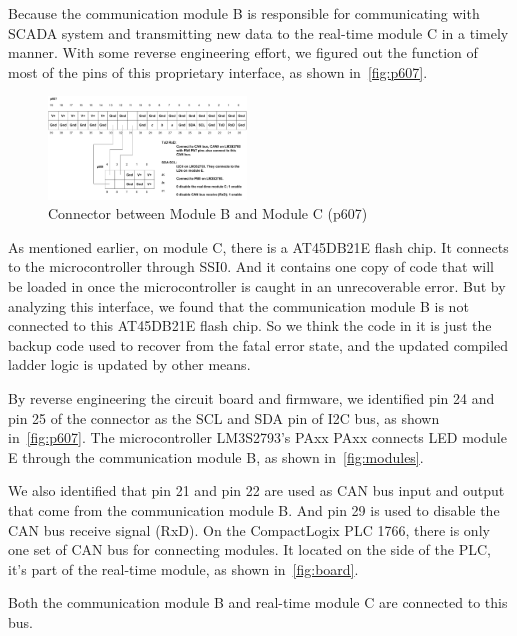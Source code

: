 Because the communication module B is responsible for communicating with SCADA system and transmitting new data to the real-time module C in a timely manner. With some reverse engineering effort, we figured out the function of most of the pins of this proprietary interface, as shown in~\autoref{fig:p607}.

\begin{figure}[th]
	\includegraphics[width=0.47\textwidth]{figures/p607}
	\centering
	\caption{Connector between Module B and Module C (p607)}
	\label{fig:p607}
\end{figure}

As mentioned earlier, on module C, there is a AT45DB21E flash chip. It connects to the microcontroller through SSI0. And it contains one copy of code that will be loaded in once the microcontroller is caught in an unrecoverable error. But by analyzing this interface, we found that the communication module B is not connected to this AT45DB21E flash chip. So we think the code in it is just the backup code used to recover from the fatal error state, and the updated compiled ladder logic is updated by other means.  

By reverse engineering the circuit board and firmware, we identified pin 24 and pin 25 of the connector as the SCL and SDA pin of I2C bus, as shown in~\autoref{fig:p607}. The microcontroller LM3S2793's PAxx PAxx connects LED module E through the communication module B, as shown in~\autoref{fig:modules}.

We also identified that pin 21 and pin 22 are used as CAN bus input and output that come from the communication module B. And pin 29 is used to disable the CAN bus receive signal (RxD). On the CompactLogix PLC 1766, there is only one set of CAN bus for connecting modules. It located on the side of the PLC, it's part of the real-time module, as shown in~\autoref{fig:board}.


Both the communication module B and real-time module C are connected to this bus.


